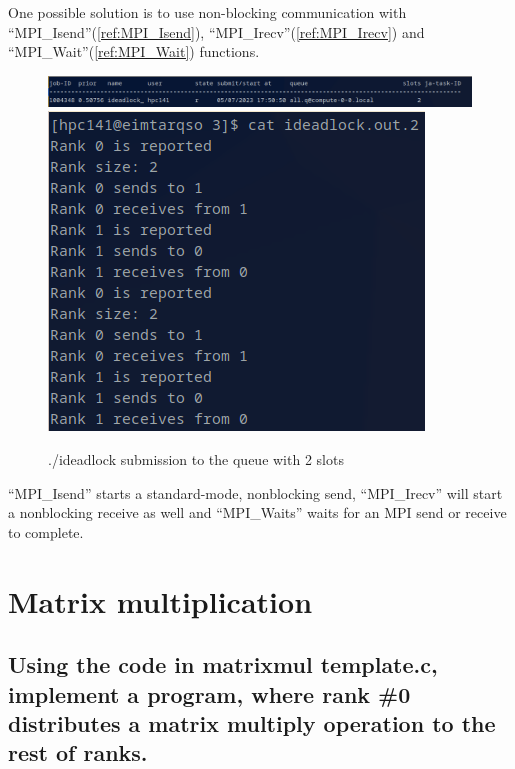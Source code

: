 \documentclass[11pt]{article}
\begin{document}
One possible solution is to use non-blocking communication with ``MPI\_Isend''(\ref{ref:MPI_Isend}), ``MPI\_Irecv''(\ref{ref:MPI_Irecv}) and ``MPI\_Wait''(\ref{ref:MPI_Wait}) functions.




\begin{figure}[h!]
    \centering
    \includegraphics{ideadlock.png}
    \includegraphics[scale=0.7]{ideadlock2.png}
    \caption*{./ideadlock submission to the queue with 2 slots}
    \label{fig:3}
\end{figure}

``MPI\_Isend'' starts a standard-mode, nonblocking send, ``MPI\_Irecv'' will start a nonblocking receive as well and ``MPI\_Waits'' waits for an MPI send or receive to complete.

\hypertarget{4}{%
\section{Matrix multiplication}\label{4}}

\subsection*{Using the code in matrixmul template.c, implement a program, where rank \#0 distributes a matrix multiply operation to the rest of ranks.}
\end{document}
